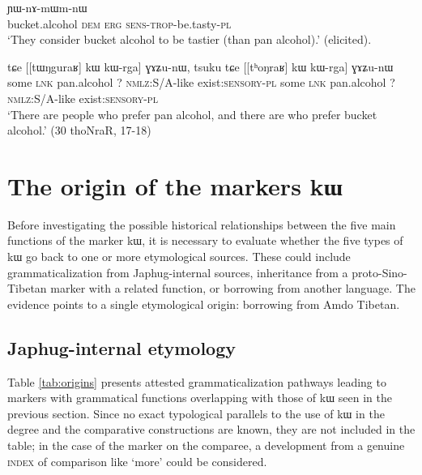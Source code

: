 \documentclass[oldfontcommands,oneside,a4paper,11pt]{article}
\newcommand{\ipa}[1]{{\phon #1}} %
\begin{document}
\begin{exe}
\ex \label{ex:nAmWm}
\gll  [\ipa{tʰoŋraʁ} 	\ipa{nɯ}] 	\ipa{kɯ} 	\ipa{ɲɯ-nɤ-mɯm-nɯ} \\
 bucket.alcohol \textsc{dem} \textsc{erg}  \textsc{sens-trop}-be.tasty-\textsc{pl} \\
 \glt `They consider  bucket alcohol to be tastier (than pan alcohol).'  (elicited).
\end{exe}

\begin{exe}
\ex \label{ex:kWrga}
\gll \ipa{tsuku}   	\ipa{tɕe}   	 [[\ipa{tɯŋguraʁ}]   	\ipa{kɯ}   	\ipa{kɯ-rga}]   	\ipa{ɣɤʑu-nɯ,}   		\ipa{tsuku}   	\ipa{tɕe}   	[[\ipa{tʰoŋraʁ}]   	\ipa{kɯ}   	\ipa{kɯ-rga}]   	\ipa{ɣɤʑu-nɯ}   \\
some \textsc{lnk} pan.alcohol ?{ } \textsc{nmlz:S/A}-like exist\textsc{:sensory}-\textsc{pl} some \textsc{lnk} pan.alcohol ?{ } \textsc{nmlz:S/A}-like exist\textsc{:sensory}-\textsc{pl} \\
\glt `There are people who prefer pan alcohol, and there are who prefer bucket alcohol.' (30 thoNraR, 17-18)
\end{exe}


%
 
 
 
 \section{The origin of the markers \ipa{kɯ}}
Before investigating the possible historical relationships between the five main functions of the marker \ipa{kɯ},  it is necessary to evaluate whether the five types of \ipa{kɯ} go back to one or more etymological sources. These could include grammaticalization from Japhug-internal sources,  inheritance from a proto-Sino-Tibetan  marker with a related function, or borrowing from another language. The evidence points to a single etymological origin: borrowing from Amdo Tibetan.

\subsection{Japhug-internal etymology}
Table \ref{tab:origins} presents attested grammaticalization pathways leading to markers with grammatical functions overlapping with those of \ipa{kɯ} seen in the previous section. Since no exact typological parallels  to the use of \ipa{kɯ} in the degree and the comparative constructions are known, they are not included in the table; in the case of the marker on the comparee, a development from a genuine \textsc{index} of comparison like `more'  could be considered.
\end{document}
